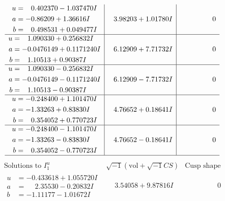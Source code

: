 \documentclass[1p]{elsarticle_modified}
\theoremstyle{definition}
\newcommand{\I}{\sqrt{-1}}
\begin{document}
$$\begin{array}{c|c|c}
\begin{aligned}
u &= \phantom{-}0.402370 - 1.037470 I \\
a &= -0.86209 + 1.36616 I \\
b &= \phantom{-}0.498531 + 0.049477 I\end{aligned}
 & \phantom{-}3.98203 + 1.01780 I & \phantom{-0.000000 } 0 \\ \hline\begin{aligned}
u &= \phantom{-}1.090330 + 0.256832 I \\
a &= -0.0476149 + 0.1171240 I \\
b &= \phantom{-}1.10513 + 0.90387 I\end{aligned}
 & \phantom{-}6.12909 + 7.71732 I & \phantom{-0.000000 } 0 \\ \hline\begin{aligned}
u &= \phantom{-}1.090330 - 0.256832 I \\
a &= -0.0476149 - 0.1171240 I \\
b &= \phantom{-}1.10513 - 0.90387 I\end{aligned}
 & \phantom{-}6.12909 - 7.71732 I & \phantom{-0.000000 } 0 \\ \hline\begin{aligned}
u &= -0.248400 + 1.101470 I \\
a &= -1.33263 + 0.83830 I \\
b &= \phantom{-}0.354052 + 0.770723 I\end{aligned}
 & \phantom{-}4.76652 + 0.18641 I & \phantom{-0.000000 } 0 \\ \hline\begin{aligned}
u &= -0.248400 - 1.101470 I \\
a &= -1.33263 - 0.83830 I \\
b &= \phantom{-}0.354052 - 0.770723 I\end{aligned}
 & \phantom{-}4.76652 - 0.18641 I & \phantom{-0.000000 } 0\\
 \hline 
 \end{array}$$\newpage$$\begin{array}{c|c|c}  
\text{Solutions to }I^u_{1}& \I (\text{vol} + \sqrt{-1}CS) & \text{Cusp shape}\\
 \hline 
\begin{aligned}
u &= -0.433618 + 1.055720 I \\
a &= \phantom{-}2.35530 - 0.20832 I \\
b &= -1.11177 - 1.01672 I\end{aligned}
 & \phantom{-}3.54058 + 9.87816 I & \phantom{-0.000000 } 0 \\ \hline\begin{aligned}

\end{aligned}
\end{array}$$
\end{document}
